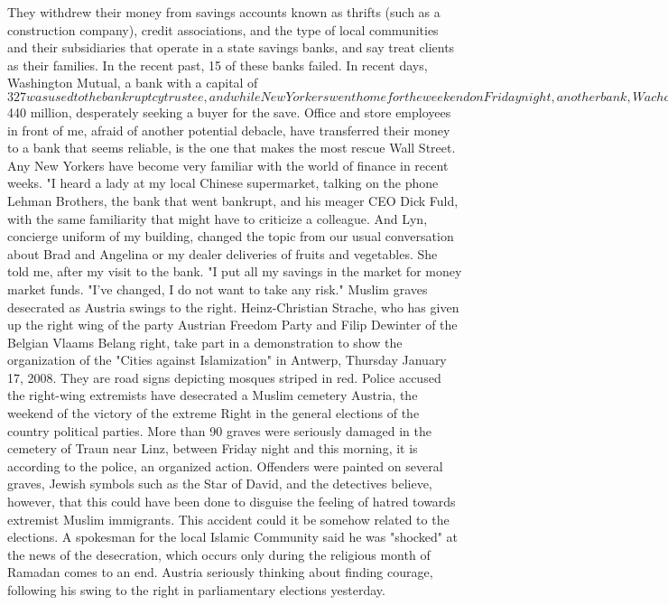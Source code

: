 They withdrew their money from savings accounts known as thrifts (such as a construction company), credit associations, and the type of local communities and their subsidiaries that operate in a state savings banks, and say treat clients as their families.
In the recent past, 15 of these banks failed.
In recent days, Washington Mutual, a bank with a capital of $ 327 was used to the bankruptcy trustee, and while New Yorkers went home for the weekend on Friday night, another bank, Wachovia, to savings accounts a value of $ 440 million, desperately seeking a buyer for the save.
Office and store employees in front of me, afraid of another potential debacle, have transferred their money to a bank that seems reliable, is the one that makes the most rescue Wall Street.
Any New Yorkers have become very familiar with the world of finance in recent weeks.
"I heard a lady at my local Chinese supermarket, talking on the phone Lehman Brothers, the bank that went bankrupt, and his meager CEO Dick Fuld, with the same familiarity that might have to criticize a colleague.
And Lyn, concierge uniform of my building, changed the topic from our usual conversation about Brad and Angelina or my dealer deliveries of fruits and vegetables.
She told me, after my visit to the bank. "I put all my savings in the market for money market funds.
"I've changed, I do not want to take any risk."
Muslim graves desecrated as Austria swings to the right.
Heinz-Christian Strache, who has given up the right wing of the party Austrian Freedom Party and Filip Dewinter of the Belgian Vlaams Belang right, take part in a demonstration to show the organization of the "Cities against Islamization" in Antwerp, Thursday January 17, 2008.
They are road signs depicting mosques striped in red.
Police accused the right-wing extremists have desecrated a Muslim cemetery Austria, the weekend of the victory of the extreme Right in the general elections of the country political parties.
More than 90 graves were seriously damaged in the cemetery of Traun near Linz, between Friday night and this morning, it is according to the police, an organized action.
Offenders were painted on several graves, Jewish symbols such as the Star of David, and the detectives believe, however, that this could have been done to disguise the feeling of hatred towards extremist Muslim immigrants.
This accident could it be somehow related to the elections.
A spokesman for the local Islamic Community said he was "shocked" at the news of the desecration, which occurs only during the religious month of Ramadan comes to an end.
Austria seriously thinking about finding courage, following his swing to the right in parliamentary elections yesterday.
